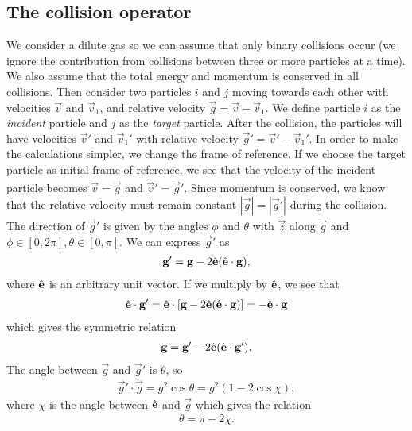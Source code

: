 \subsection{The collision operator}
We consider a dilute gas so we can assume that only binary collisions occur (we ignore the contribution from collisions between three or more particles at a time). We also assume that the total energy and momentum is conserved in all collisions. Then consider two particles $i$ and $j$ moving towards each other with velocities $\vec v$ and $\vec v_1$, and relative velocity $\vec g = \vec v - \vec v_1$. We define particle $i$ as the \textit{incident} particle and $j$ as the \textit{target} particle. After the collision, the particles will have velocities $\vec v'$ and $\vec v_1'$ with relative velocity $\vec g' = \vec v' - \vec v_1'$. In order to make the calculations simpler, we change the frame of reference. If we choose the target particle as initial frame of reference, we see that the velocity of the incident particle becomes $\tilde {\vec v} = \vec g$ and $\tilde {\vec v}' = \vec g'$. Since momentum is conserved, we know that the relative velocity must remain constant $|\vec g| = |\vec g'|$ during the collision. The direction of $\vec g'$ is given by the angles $\phi$ and $\theta$ with $\hat {\vec z}$ along $\vec g$ and $\phi \in [0, 2\pi], \theta \in [0, \pi]$. We can express $\vec g'$ as
\begin{align}
	\mathbf g' = \mathbf g - 2\hat {\mathbf{e}}(\hat {\mathbf{e}}\cdot\mathbf g),
\end{align}
where $\hat {\mathbf{e}}$ is an arbitrary unit vector.  If we multiply by $\hat {\mathbf{e}}$, we see that 
\begin{align}
	\hat {\mathbf{e}}\cdot \mathbf g' = \hat {\mathbf{e}}\cdot\left[\mathbf g - 2\hat {\mathbf{e}}(\hat {\mathbf{e}}\cdot\mathbf g)\right] = -\hat {\mathbf{e}} \cdot \mathbf g
\end{align}
which gives the symmetric relation
\begin{align}
	\mathbf g = \mathbf g' - 2\hat {\mathbf{e}}(\hat {\mathbf{e}}\cdot\mathbf g').
\end{align}
The angle between $\vec g$ and $\vec g'$ is $\theta$, so
\begin{align}
	\vec g'\cdot \vec g = g^2\cos\theta = g^2(1 - 2\cos \chi),
\end{align}
where $\chi$ is the angle between $\hat {\mathbf{e}}$ and $\vec g$ which gives the relation
\begin{align}
	\theta = \pi - 2\chi.
\end{align}
